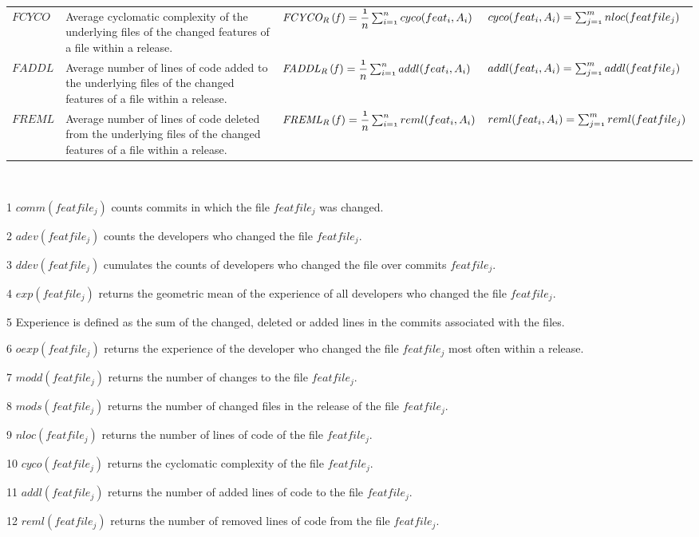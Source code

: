 \begin{table}[!t]
\begin{threeparttable}
\begin{tabulary}{\textwidth}{p{1cm}p{5cm}p{5cm}p{5cm}}
			$FCYCO$ & Average cyclomatic complexity of the underlying files of the changed features of a file within a release. & $\mathit{FCYCO_R\,(f)} = \mathnormal{\dfrac{1}{n}\sum_{i=1}^{n} cyco(feat_i,A_i)}$ & $\mathnormal{cyco(feat_i,A_i) = \sum_{j=1}^{m} nloc(featfile_j) }$ \\								
			$FADDL$ & Average number of lines of code added to the underlying files of the changed features of a file within a release. & $\mathit{FADDL_R\,(f)} = \mathnormal{\dfrac{1}{n}\sum_{i=1}^{n} addl(feat_i,A_i)}$ & $\mathnormal{addl(feat_i,A_i) = \sum_{j=1}^{m} addl(featfile_j) }$ \\
			$FREML$ & Average number of lines of code deleted from the underlying files of the changed features of a file within a release. & $\mathit{FREML_R\,(f)} = \mathnormal{\dfrac{1}{n}\sum_{i=1}^{n} reml(feat_i,A_i)}$ & $\mathnormal{reml(feat_i,A_i) = \sum_{j=1}^{m} reml(featfile_j) }$ \\						
			\bottomrule				
		\end{tabulary}
		\begin{tablenotes}[para]
			~\item[1] $comm(featfile_j)$ counts commits in which the file $featfile_j$ was changed.
			~\item[2] $adev(featfile_j)$ counts the developers who changed the file $featfile_j$.  
			~\item[3] $ddev(featfile_j)$ cumulates the counts of developers who changed the file over commits $featfile_j$.
			~\item[4] $exp(featfile_j)$ returns the geometric mean of the experience of all developers who changed the file $featfile_j$.
			~\item[5] Experience is defined as the sum of the changed, deleted or added lines in the commits associated with the files.
			~\item[6] $oexp(featfile_j)$ returns the experience of the developer who changed the file $featfile_j$ most often within a release.
			~\item[7] $modd(featfile_j)$ returns the number of changes to the file $featfile_j$.
			~\item[8] $mods(featfile_j)$  returns the number of changed files in the release of the file $featfile_j$.
			~\item[9] $nloc(featfile_j)$ returns the number of lines of code of the file $featfile_j$.
			~\item[10] $cyco(featfile_j)$ returns the cyclomatic complexity of the file $featfile_j$.
			~\item[11] $addl(featfile_j)$ returns the number of added lines of code to the file $featfile_j$.
			~\item[12] $reml(featfile_j)$ returns the number of removed lines of code from the file $featfile_j$.
		\end{tablenotes}
	\end{threeparttable}
	\vspace{-0.3cm}
\end{table}
